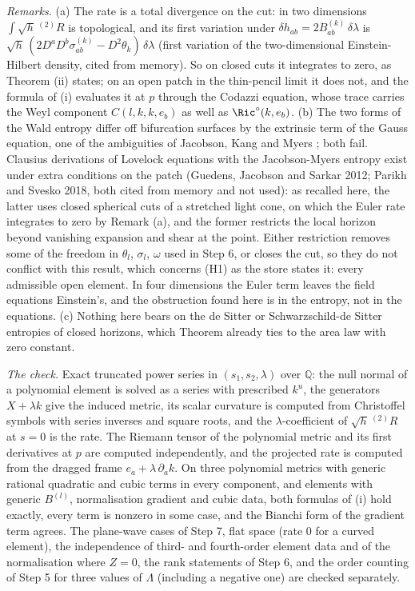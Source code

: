 \emph{Remarks.} (a) The rate is a total divergence on the cut: in two dimensions $\int\sqrt{h}\,{}^{(2)}\!R$ is topological, and its first variation under $\delta h_{ab} = 2B^{(k)}_{ab}\,\delta\lambda$ is $\sqrt{h}\,(2D^{a}D^{b}\sigma^{(k)}_{ab} - D^{2}\theta_{k})\,\delta\lambda$ (first variation of the two-dimensional Einstein-Hilbert density, cited from memory). So on closed cuts it integrates to zero, as Theorem (ii) states; on an open patch in the thin-pencil limit it does not, and the formula of (i) evaluates it at $p$ through the Codazzi equation, whose trace carries the Weyl component $C(l,k,k,e_{b})$ as well as $\Ric^{\circ}(k,e_{b})$. (b) The two forms of the Wald entropy differ off bifurcation surfaces by the extrinsic term of the Gauss equation, one of the ambiguities of Jacobson, Kang and Myers \cite{JacobsonKangMyers1994}; both fail. Clausius derivations of Lovelock equations with the Jacobson-Myers entropy exist under extra conditions on the patch (Guedens, Jacobson and Sarkar 2012; Parikh and Svesko 2018, both cited from memory and not used): as recalled here, the latter uses closed spherical cuts of a stretched light cone, on which the Euler rate integrates to zero by Remark (a), and the former restricts the local horizon beyond vanishing expansion and shear at the point. Either restriction removes some of the freedom in $\theta_{l}$, $\sigma_{l}$, $\omega$ used in Step 6, or closes the cut, so they do not conflict with this result, which concerns (H1) as the store states it: every admissible open element. In four dimensions the Euler term leaves the field equations Einstein's, and the obstruction found here is in the entropy, not in the equations. (c) Nothing here bears on the de Sitter or Schwarzschild-de Sitter entropies of closed horizons, which Theorem  already ties to the area law with zero constant.

\emph{The check.} Exact truncated power series in $(s_{1}, s_{2}, \lambda)$ over $\mathbb{Q}$: the null normal of a polynomial element is solved as a series with prescribed $k^{u}$, the generators $X + \lambda k$ give the induced metric, its scalar curvature is computed from Christoffel symbols with series inverses and square roots, and the $\lambda$-coefficient of $\sqrt{h}\,{}^{(2)}\!R$ at $s = 0$ is the rate. The Riemann tensor of the polynomial metric and its first derivatives at $p$ are computed independently, and the projected rate is computed from the dragged frame $e_{a} + \lambda\,\partial_{a}k$. On three polynomial metrics with generic rational quadratic and cubic terms in every component, and elements with generic $B^{(l)}$, normalisation gradient and cubic data, both formulas of (i) hold exactly, every term is nonzero in some case, and the Bianchi form of the gradient term agrees. The plane-wave cases of Step 7, flat space (rate $0$ for a curved element), the independence of third- and fourth-order element data and of the normalisation where $Z = 0$, the rank statements of Step 6, and the order counting of Step 5 for three values of $\Lambda$ (including a negative one) are checked separately.

